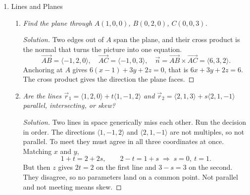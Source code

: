 \documentclass[12pt]{article}
\newenvironment{solution}
  {\renewcommand\qedsymbol{$\blacksquare$}\begin{proof}[Solution]}
  {\end{proof}}
\begin{document}
\begin{enumerate}
\begin{enumerate}
\begin{solution}
    \begin{center}
    \end{center}
    \end{solution}

    \end{enumerate}
\newpage

\item Lines and Planes

    \begin{enumerate}
    \item \textit{Find the plane through $A(1,0,0)$, $B(0,2,0)$, $C(0,0,3)$.}

    \begin{solution}
    Two edges out of $A$ span the plane, and their cross product is the normal that turns the picture into one equation.
    \[
      \overrightarrow{AB}=\langle-1,2,0\rangle,\quad \overrightarrow{AC}=\langle-1,0,3\rangle,\quad
      \vec n=\overrightarrow{AB}\times\overrightarrow{AC}=\langle6,3,2\rangle.
    \]
    Anchoring at $A$ gives $6(x-1)+3y+2z=0$, that is $6x+3y+2z=6$. The cross product gives the direction the plane faces.
    \end{solution}

    \item \textit{Are the lines $\vec r_1=\langle1,2,0\rangle+t\langle1,-1,2\rangle$ and $\vec r_2=\langle2,1,3\rangle+s\langle2,1,-1\rangle$ parallel, intersecting, or skew?}

    \begin{solution}
    Two lines in space generically miss each other. Run the decision in order. The directions $\langle1,-1,2\rangle$ and $\langle2,1,-1\rangle$ are not multiples, so not parallel. To meet they must agree in all three coordinates at once. Matching $x$ and $y$,
    \[
      1+t=2+2s,\qquad 2-t=1+s \;\Longrightarrow\; s=0,\ t=1.
    \]
    But then $z$ gives $2t=2$ on the first line and $3-s=3$ on the second. They disagree, so no parameters land on a common point. Not parallel and not meeting means skew.
    \end{solution}


\end{enumerate}
\end{enumerate}
\end{document}
